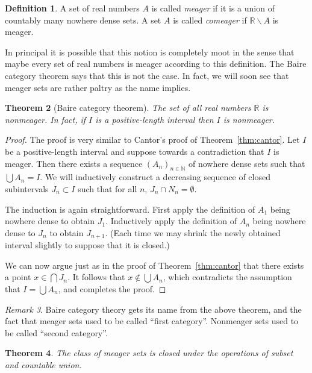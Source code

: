 \documentclass[11pt,oneside]{amsbook}
\newcommand{\NN}{\mathbb N}
\newcommand{\RR}{\mathbb R}
\theoremstyle{definition}
\theoremstyle{plain}
\newtheorem{thm}{Theorem}[section]
\theoremstyle{definition}
\newtheorem{defn}[thm]{Definition}
\theoremstyle{remark}
\newtheorem{rem}[thm]{Remark}
\begin{document}
\begin{defn}
  A set of real numbers $A$ is called \emph{meager} if it is a union of countably many nowhere dense sets. A set $A$ is called \emph{comeager} if $\RR\smallsetminus A$ is meager.
\end{defn}

In principal it is possible that this notion is completely moot in the sense that maybe every set of real numbers is meager according to this definition. The Baire category theorem says that this is not the case. In fact, we will soon see that meager sets are rather paltry as the name implies.

\begin{thm}[Baire category theorem]
  \label{thm:baire}
  The set of all real numbers $\RR$ is nonmeager. In fact, if $I$ is a positive-length interval then $I$ is nonmeager.
\end{thm}

\begin{proof}
  The proof is very similar to Cantor's proof of Theorem~\ref{thm:cantor}. Let $I$ be a positive-length interval and suppose towards a contradiction that $I$ is meager. Then there exists a sequence $(A_n)_{n\in\NN}$ of nowhere dense sets such that $\bigcup A_n=I$. We will inductively construct a decreasing sequence of closed subintervals $J_n\subset I$ such that for all $n$, $J_n\cap N_n=\emptyset$.

  The induction is again straightforward. First apply the definition of $A_1$ being nowhere dense to obtain $J_1$. Inductively apply the definition of $A_n$ being nowhere dense to $J_n$ to obtain $J_{n+1}$. (Each time we may shrink the newly obtained interval slightly to suppose that it is closed.)

  We can now argue just as in the proof of Theorem~\ref{thm:cantor} that there exists a point $x\in\bigcap J_n$. It follows that $x\notin\bigcup A_n$, which contradicts the assumption that $I=\bigcup A_n$, and completes the proof.
\end{proof}

\begin{rem}
  Baire category theory gets its name from the above theorem, and the fact that meager sets used to be called ``first category''. Nonmeager sets used to be called ``second category''.
\end{rem}

\begin{thm}
  \label{thm:meager-pres}
  The class of meager sets is closed under the operations of subset and countable union.
\end{thm}
\end{document}
